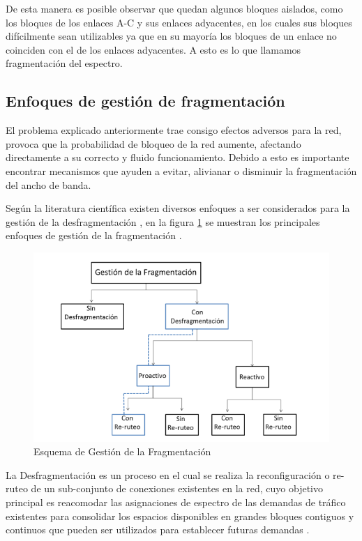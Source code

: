 De esta manera es posible observar que quedan algunos bloques aislados, como los bloques de los enlaces A-C y sus enlaces adyacentes, en los cuales sus bloques difícilmente  sean utilizables ya que en su mayoría los bloques de un enlace no coinciden con el de los enlaces adyacentes. A esto es lo que llamamos fragmentación del espectro. 

\subsection{Enfoques de gestión de fragmentación}
El problema explicado anteriormente trae consigo efectos adversos para la red, provoca que la probabilidad de bloqueo de la red aumente, afectando directamente a su correcto y fluido funcionamiento. Debido a esto es importante encontrar mecanismos que ayuden a evitar, alivianar o disminuir la fragmentación del ancho de banda. 

Según la literatura científica existen diversos enfoques a ser considerados para la gestión de la desfragmentación , en la figura \ref{fig:gestion_fragmentacion} se muestran los principales enfoques de gestión de la fragmentación \cite{chatterjee2017fragmentation}.

\begin{figure}
    \centering
    \includegraphics[width=1\textwidth]{capitulos/img/Gestion_Fragmentacion.PNG}
    \caption{Esquema de Gestión de la Fragmentación}
    \label{fig:gestion_fragmentacion}
\end{figure}

La Desfragmentación es un proceso en el cual se realiza la reconfiguración o re-ruteo de un sub-conjunto de conexiones existentes en la red, cuyo objetivo principal es reacomodar las asignaciones de espectro de las demandas de tráfico existentes
para consolidar los espacios disponibles en grandes bloques contiguos y continuos que pueden ser utilizados para establecer futuras demandas \cite{talebi2014spectrum}.


